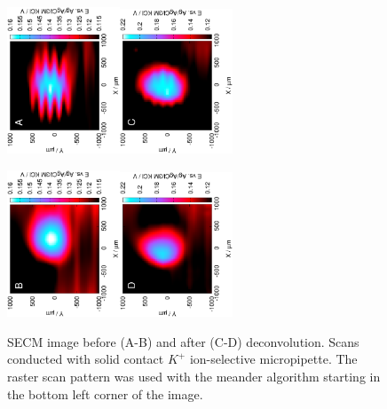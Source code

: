 \begin{figure}
\centering
\includegraphics[trim = 10mm 30mm 0mm 10mm, clip, width=0.3\textwidth, angle=-90]{img/K/14103106.eps}\includegraphics[trim = 10mm 30mm 0mm 10mm, clip, width=0.3\textwidth, angle=-90]{img/K/14103106_deconvoluted.eps}%

\includegraphics[trim = 10mm 30mm 0mm 10mm, clip, width=0.3\textwidth, angle=-90]{img/K/14103107.eps}\includegraphics[trim = 10mm 30mm 0mm 10mm, clip, width=0.3\textwidth, angle=-90]{img/K/14103107_deconvoluted.eps}

\caption[SECM image before and after deconvolution.
Scans conducted with solid contact $K^+$ ion-selective micropipette.]{SECM image before (A-B) and after (C-D) deconvolution.
Scans conducted with solid contact $K^+$ ion-selective micropipette.
The raster scan pattern was used with the meander algorithm starting in the bottom left corner of the image.}
\label{fig:deconvolution_potassium}
\end{figure}


